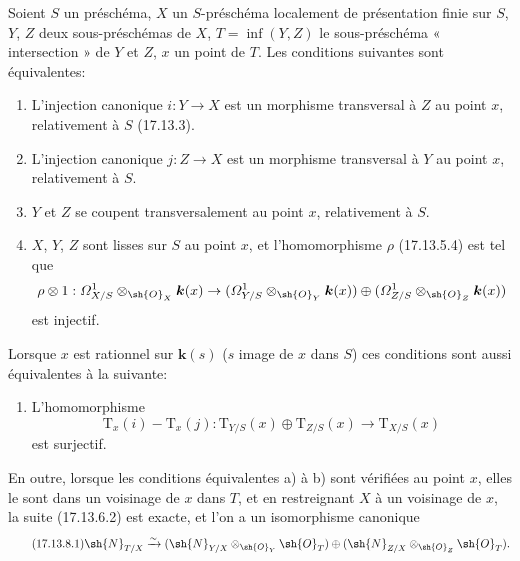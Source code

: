 \begin{proposition}[17.13.8]
\label{IV.17.13.8}
Soient $S$ un préschéma, $X$ un $S$-préschéma localement de présentation finie sur $S$, $Y$, $Z$ deux sous-préschémas de $X$, $T=\inf(Y,Z)$ le sous-préschéma « intersection » de $Y$ et $Z$, $x$ un point de $T$. Les conditions suivantes sont équivalentes:
\begin{enumerate}
  \item[\textup{a)}] L'injection canonique $i:Y\to X$ est un morphisme transversal à $Z$ au point $x$, relativement à $S$ \textup{(17.13.3)}.
  \item[\textup{a$'$)}] L'injection canonique $j:Z\to X$ est un morphisme transversal à $Y$ au point $x$, relativement à $S$.
  \item[\textup{a$''$)}] $Y$ et $Z$ se coupent transversalement au point $x$, relativement à $S$.
  \item[\textup{b)}] $X$, $Y$, $Z$ sont lisses sur $S$ au point $x$, et l'homomorphisme $\rho$ \textup{(17.13.5.4)} est tel que
  \[
  \rho\otimes1:\varOmega^1_{X/S}\otimes_{\sh{O}_X}\boldsymbol{k}(x)\to
  (\varOmega^1_{Y/S}\otimes_{\sh{O}_Y}\boldsymbol{k}(x))\oplus
  (\varOmega^1_{Z/S}\otimes_{\sh{O}_Z}\boldsymbol{k}(x))
  \]
  est injectif.
\end{enumerate}

Lorsque $x$ est rationnel sur $\boldsymbol{k}(s)$ \textup{(}$s$ image de $x$ dans $S$\textup{)} ces conditions sont aussi équivalentes à la suivante:
\begin{enumerate}
  \item[\textup{b$'$)}] L'homomorphisme
  \[
  \mathrm{T}_x(i)-\mathrm{T}_x(j):\mathrm{T}_{Y/S}(x)\oplus\mathrm{T}_{Z/S}(x)\to\mathrm{T}_{X/S}(x)
  \]
  est surjectif.
\end{enumerate}

En outre, lorsque les conditions équivalentes \textup{a)} à \textup{b)} sont vérifiées au point $x$, elles le sont dans un voisinage de $x$ dans $T$, et en restreignant $X$ à un voisinage de $x$, la suite \textup{(17.13.6.2)} est exacte, et l'on a un isomorphisme canonique
\[
\label{IV.17.13.8.1}
\tag{17.13.8.1}
\sh{N}_{T/X}\xrightarrow{\sim}
(\sh{N}_{Y/X}\otimes_{\sh{O}_Y}\sh{O}_T)\oplus
(\sh{N}_{Z/X}\otimes_{\sh{O}_Z}\sh{O}_T).
\]
\end{proposition}


